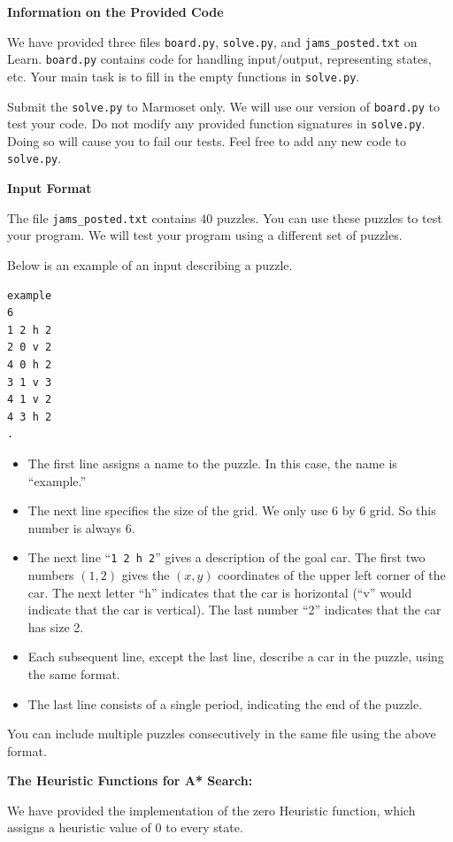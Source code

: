 \documentclass[12pt]{article}
\begin{document}
{\bf Information on the Provided Code}

We have provided three files \verb+board.py+,  \verb+solve.py+, and \verb+jams_posted.txt+ on Learn. \verb+board.py+ contains code for handling input/output, representing states, etc. Your main task is to fill in the empty functions in \verb+solve.py+.

Submit the \verb+solve.py+ to Marmoset only. We will use our version of \verb+board.py+ to test your code. Do not modify any provided function signatures in \verb+solve.py+. Doing so will cause you to fail our tests. Feel free to add any new code to \verb+solve.py+. 

{\bf Input Format}

The file \verb+jams_posted.txt+ contains $40$ puzzles. You can use these puzzles to test your program. We will test your program using a different set of puzzles.

Below is an example of an input describing a puzzle.

\begin{verbatim}
example
6
1 2 h 2
2 0 v 2
4 0 h 2
3 1 v 3
4 1 v 2
4 3 h 2
.  
\end{verbatim}

\begin{itemize}
\item The first line assigns a name to the puzzle. In this case, the name is ``example.''
\item The next line specifies the size of the grid. We only use 6 by 6 grid. So this number is always 6.
\item The next line ``\verb+1 2 h 2+'' gives a description of the goal car.  The first two numbers $(1,2)$ gives the $(x,y)$ coordinates of the upper left corner of the car. The next letter ``h'' indicates that the car is horizontal (``v'' would indicate that the car is vertical). The last number ``2'' indicates that the car has size 2.
\item Each subsequent line, except the last line, describe a car in the puzzle, using the same format.
\item The last line consists of a single period, indicating the end of the puzzle. 
\end{itemize}

You can include multiple puzzles consecutively in the same file using the above format. 

{\bf The Heuristic Functions for A* Search:}

We have provided the implementation of the zero Heuristic function, which assigns a heuristic value of 0 to every state.
\end{document}
